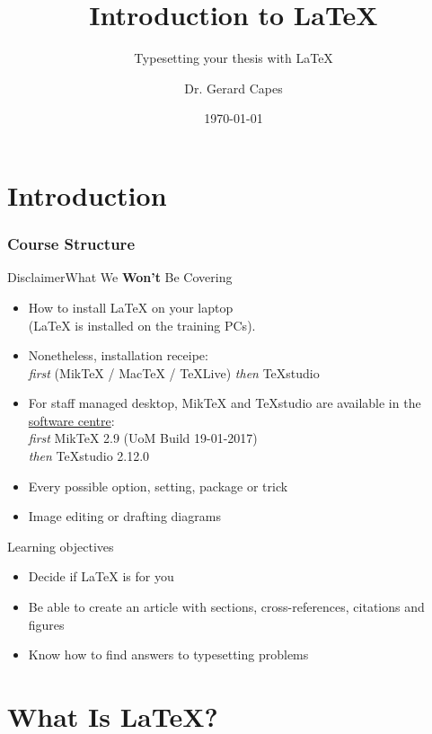 \documentclass[12pt]{beamer}
\title{Introduction to \LaTeX}
\subtitle{Typesetting your thesis with \LaTeX}
\author{Dr. Gerard Capes}
\institute{Research IT\\University of Manchester}
\date{\today{}}
\begin{document}
\begin{frame}
	\titlepage
\end{frame}

\section{Introduction}

\begin{frame}
	\frametitle{Course Structure}
	\tableofcontents
\end{frame}

\begin{frame}{Disclaimer}{What We \textbf{Won't} Be Covering}
	\begin{itemize}
		\item How to install \LaTeX{} on your laptop\\
		(\LaTeX{} is installed on the training PCs).
		\item Nonetheless, installation receipe:\\ \emph{first} (MikTeX / MacTeX / TeXLive) \emph{then} TeXstudio
		\item For staff managed desktop, MikTeX and TeXstudio are available in the \href{http://softwarecentre.itservices.manchester.ac.uk/}{software centre}:\\
		\emph{first} MikTeX 2.9 (UoM Build 19-01-2017)\\
		\emph{then} TeXstudio 2.12.0
		\item Every possible option, setting, package or trick
		\item Image editing or drafting diagrams
	\end{itemize}
\end{frame}

\begin{frame}{Learning objectives}
	\begin{itemize}
		\item Decide if \LaTeX{} is for you
		\item Be able to create an article with sections, cross-references, citations and figures
		\item Know how to find answers to typesetting problems
	\end{itemize}
\end{frame}

\section{What Is \LaTeX?}
\end{document}
